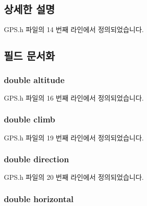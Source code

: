 \subsection{상세한 설명}


G\-P\-S.\-h 파일의 14 번째 라인에서 정의되었습니다.



\subsection{필드 문서화}
\hypertarget{struct__location_a2b13d276aee0d9fd646c8fa3647e869b}{
\subsubsection[{altitude}]{\setlength{\rightskip}{0pt plus 5cm}double altitude}}\label{struct__location_a2b13d276aee0d9fd646c8fa3647e869b}


G\-P\-S.\-h 파일의 16 번째 라인에서 정의되었습니다.

\hypertarget{struct__location_a72cbc74638e72ebd02fc3b0bd2cb80af}{
\subsubsection[{climb}]{\setlength{\rightskip}{0pt plus 5cm}double climb}}\label{struct__location_a72cbc74638e72ebd02fc3b0bd2cb80af}


G\-P\-S.\-h 파일의 19 번째 라인에서 정의되었습니다.

\hypertarget{struct__location_a8da9718bd3d0396135453cbb12751a5b}{
\subsubsection[{direction}]{\setlength{\rightskip}{0pt plus 5cm}double direction}}\label{struct__location_a8da9718bd3d0396135453cbb12751a5b}


G\-P\-S.\-h 파일의 20 번째 라인에서 정의되었습니다.

\hypertarget{struct__location_aababb3cab13d0b7706c591b114d9ef9a}{
\subsubsection[{horizontal}]{\setlength{\rightskip}{0pt plus 5cm}double horizontal}}\label{struct__location_aababb3cab13d0b7706c591b114d9ef9a}


